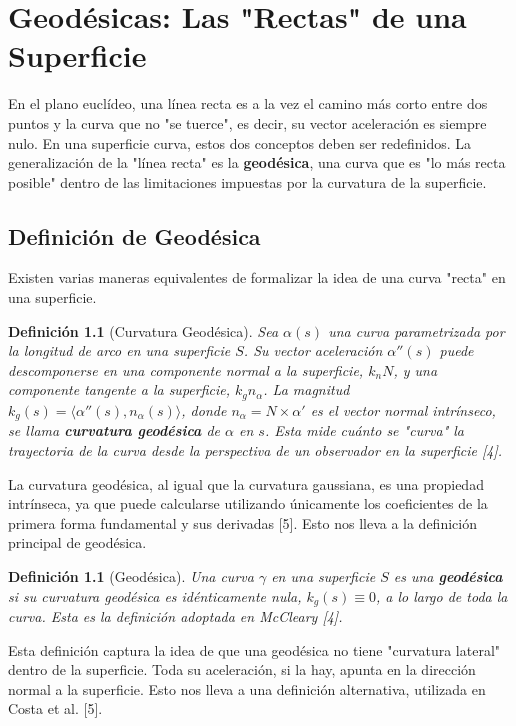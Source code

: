 \documentclass[12pt, a4paper]{report}
\theoremstyle{miestilo}
\theoremstyle{midefinicion}
\newtheorem{definicion}[teorema]{Definición}
\begin{document}
\chapter{Geodésicas: Las "Rectas" de una Superficie}

En el plano euclídeo, una línea recta es a la vez el camino más corto entre dos puntos y la curva que no "se tuerce", es decir, su vector aceleración es siempre nulo. En una superficie curva, estos dos conceptos deben ser redefinidos. La generalización de la "línea recta" es la \textbf{geodésica}, una curva que es "lo más recta posible" dentro de las limitaciones impuestas por la curvatura de la superficie.

\section{Definición de Geodésica}

Existen varias maneras equivalentes de formalizar la idea de una curva "recta" en una superficie.

\begin{definicion}[Curvatura Geodésica]
Sea $\alpha(s)$ una curva parametrizada por la longitud de arco en una superficie $S$. Su vector aceleración $\alpha''(s)$ puede descomponerse en una componente normal a la superficie, $k_n N$, y una componente tangente a la superficie, $k_g n_\alpha$. La magnitud $k_g(s) = \langle \alpha''(s), n_\alpha(s) \rangle$, donde $n_\alpha = N \times \alpha'$ es el vector normal intrínseco, se llama \textbf{curvatura geodésica} de $\alpha$ en $s$. Esta mide cuánto se "curva" la trayectoria de la curva desde la perspectiva de un observador en la superficie [4].
\end{definicion}

La curvatura geodésica, al igual que la curvatura gaussiana, es una propiedad intrínseca, ya que puede calcularse utilizando únicamente los coeficientes de la primera forma fundamental y sus derivadas [5]. Esto nos lleva a la definición principal de geodésica.

\begin{definicion}[Geodésica]
Una curva $\gamma$ en una superficie $S$ es una \textbf{geodésica} si su curvatura geodésica es idénticamente nula, $k_g(s) \equiv 0$, a lo largo de toda la curva. Esta es la definición adoptada en McCleary [4].
\end{definicion}

Esta definición captura la idea de que una geodésica no tiene "curvatura lateral" dentro de la superficie. Toda su aceleración, si la hay, apunta en la dirección normal a la superficie. Esto nos lleva a una definición alternativa, utilizada en Costa et al. [5].
\end{document}
